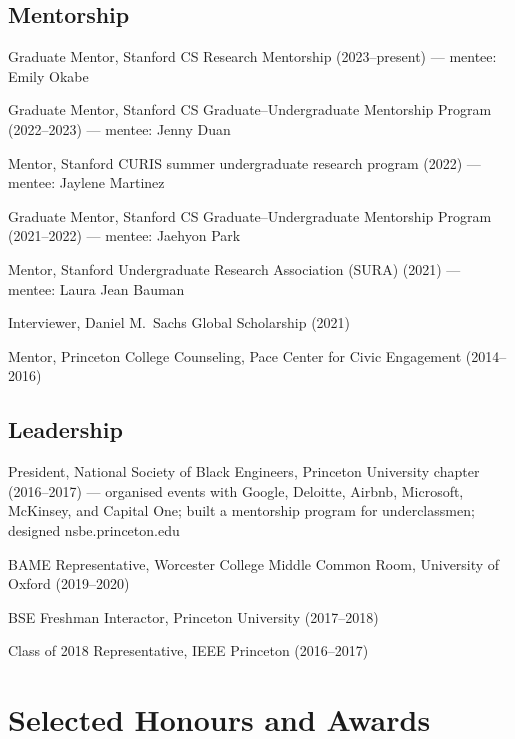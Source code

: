 \documentclass[11pt,letterpaper]{article}
\begin{document}
\subsection*{Mentorship}
\begin{tight}
  \item Graduate Mentor, Stanford CS Research Mentorship (2023--present) --- mentee: Emily Okabe
  \item Graduate Mentor, Stanford CS Graduate--Undergraduate Mentorship Program (2022--2023) --- mentee: Jenny Duan
  \item Mentor, Stanford CURIS summer undergraduate research program (2022) --- mentee: Jaylene Martinez
  \item Graduate Mentor, Stanford CS Graduate--Undergraduate Mentorship Program (2021--2022) --- mentee: Jaehyon Park
  \item Mentor, Stanford Undergraduate Research Association (SURA) (2021) --- mentee: Laura Jean Bauman
  \item Interviewer, Daniel M.~Sachs Global Scholarship (2021)
  \item Mentor, Princeton College Counseling, Pace Center for Civic Engagement (2014--2016)
\end{tight}

\subsection*{Leadership}
\begin{tight}
  \item President, National Society of Black Engineers, Princeton University chapter (2016--2017) --- organised events with Google, Deloitte, Airbnb, Microsoft, McKinsey, and Capital One; built a mentorship program for underclassmen; designed nsbe.princeton.edu
  \item BAME Representative, Worcester College Middle Common Room, University of Oxford (2019--2020)
  \item BSE Freshman Interactor, Princeton University (2017--2018)
  \item Class of 2018 Representative, IEEE Princeton (2016--2017)
\end{tight}

\section{Selected Honours and Awards}
\end{document}
